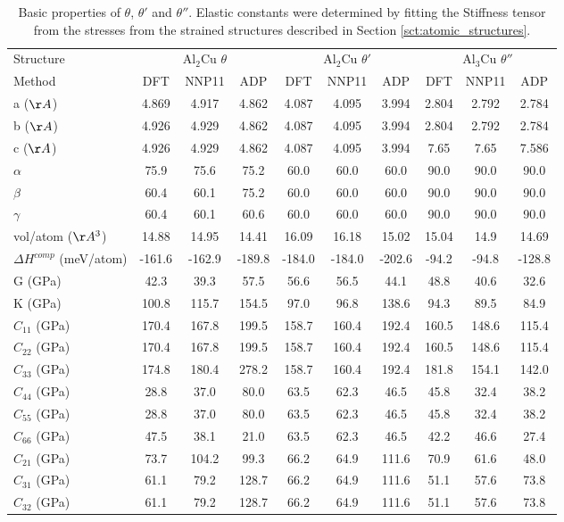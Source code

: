 \documentclass{article}
\begin{document}
\begin{table}[H]
\begin{tabular}{l|ccc|ccc|ccc}%
\hline%
Structure&\multicolumn{3}{c}{Al$_2$Cu  $\theta$}&\multicolumn{3}{c}{Al$_2$Cu $\theta'$}&\multicolumn{3}{c}{Al$_3$Cu $\theta''$}\\%
Method&DFT&NNP11&ADP&DFT&NNP11&ADP&DFT&NNP11&ADP\\%
\hline%
a ($\AA$)&4.869&4.917&4.862&4.087&4.095&3.994&2.804&2.792&2.784\\%
b ($\AA$)&4.926&4.929&4.862&4.087&4.095&3.994&2.804&2.792&2.784\\%
c ($\AA$)&4.926&4.929&4.862&4.087&4.095&3.994&7.65&7.65&7.586\\%
$\alpha$&75.9&75.6&75.2&60.0&60.0&60.0&90.0&90.0&90.0\\%
$\beta$&60.4&60.1&75.2&60.0&60.0&60.0&90.0&90.0&90.0\\%
$\gamma$&60.4&60.1&60.6&60.0&60.0&60.0&90.0&90.0&90.0\\%
vol/atom ($\AA^3$)&14.88&14.95&14.41&16.09&16.18&15.02&15.04&14.9&14.69\\%
$\Delta H^{comp}$ (meV/atom)&{-}161.6&{-}162.9&{-}189.8&{-}184.0&{-}184.0&{-}202.6&{-}94.2&{-}94.8&{-}128.8\\%
G (GPa)&42.3&39.3&57.5&56.6&56.5&44.1&48.8&40.6&32.6\\%
K (GPa)&100.8&115.7&154.5&97.0&96.8&138.6&94.3&89.5&84.9\\%
$C_{11}$ (GPa)&170.4&167.8&199.5&158.7&160.4&192.4&160.5&148.6&115.4\\%
$C_{22}$ (GPa)&170.4&167.8&199.5&158.7&160.4&192.4&160.5&148.6&115.4\\%
$C_{33}$ (GPa)&174.8&180.4&278.2&158.7&160.4&192.4&181.8&154.1&142.0\\%
$C_{44}$ (GPa)&28.8&37.0&80.0&63.5&62.3&46.5&45.8&32.4&38.2\\%
$C_{55}$ (GPa)&28.8&37.0&80.0&63.5&62.3&46.5&45.8&32.4&38.2\\%
$C_{66}$ (GPa)&47.5&38.1&21.0&63.5&62.3&46.5&42.2&46.6&27.4\\%
$C_{21}$ (GPa)&73.7&104.2&99.3&66.2&64.9&111.6&70.9&61.6&48.0\\%
$C_{31}$ (GPa)&61.1&79.2&128.7&66.2&64.9&111.6&51.1&57.6&73.8\\%
$C_{32}$ (GPa)&61.1&79.2&128.7&66.2&64.9&111.6&51.1&57.6&73.8\\%
\hline%
\end{tabular}%
\caption{Basic properties of $\theta$, $\theta'$ and $\theta''$.   Elastic constants were determined by fitting the Stiffness tensor from the stresses from the strained structures described in Section \ref{sct:atomic_structures}.}
\end{table}
\end{document}
